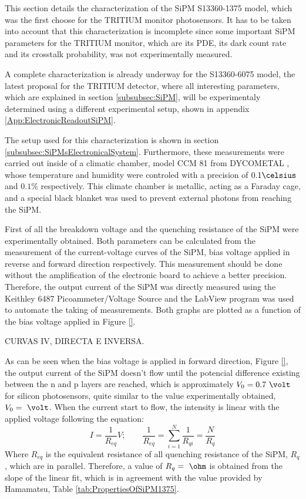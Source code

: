 This section details the characterization of the SiPM S13360-1375 model, which was the first choose for the TRITIUM monitor photosensors. It has to be taken into account that this characterization is incomplete since some important SiPM parameters for the TRITIUM monitor, which are its PDE, its dark count rate and its crosstalk probability, was not experimentally measured. 

A complete characterization is already underway for the S13360-6075 model, the latest proposal for the TRITIUM detector, where all interesting parameters, which are explained in section \ref{subsubsec:SiPM}, will be experimentaly determined using a different experimental setup, shown in appendix \ref{App:ElectronicReadoutSiPM}.

The setup used for this characterization is shown in section \ref{subsubsec:SiPMsElectronicalSystem}. Furthermore, these measurements were carried out inside of a climatic chamber, model CCM 81 from DYCOMETAL \cite{ClimaticChamberIFIMED}, whose temperature and humidity were controled with a precision of $0.1\celsius$ and $0.1\%$ respectively. This climate chamber is metallic, acting as a Faraday cage, and a special black blanket \cite{BlackBlancket} was used to prevent external photons from reaching the SiPM.

First of all the breakdown voltage and the quenching resistance of the SiPM were experimentally obtained. Both parameters can be calculated from the measurement of the current-voltage curves of the SiPM, bias voltage applied in reverse and forward direction respectively. This measurement should be done without the amplification of the electronic board to achieve a better precision. Therefore, the output current of the SiPM was directly measured using the Keithley 6487 Picoammeter/Voltage Source \cite{DataSheetKeithley6487} and the LabView program was used to automate the taking of measurements. Both graphs are plotted as a function of the bias voltage applied in Figure \ref{}.

CURVAS IV, DIRECTA E INVERSA.

As can be seen when the bias voltage is applied in forward direction, Figure \ref{}, the output current of the SiPM doesn't flow until the potencial difference existing between the n and p layers are reached, which is approximately $V_0=0.7~\volt$ for silicon photosensors, quite similar to the value experimentally obtained, $V_0= ~\volt$. When the current start to flow, the intensity is linear with the applied voltage following the equation:
\begin{equation}
I=\frac{1}{R_{eq}}V;  \qquad \frac{1}{R_{eq}} = \sum_{i=1}^{N}\frac{1}{R_{qi}}= \frac{N}{R_{q}}
\label{QuenchingResistance}
\end{equation}
Where $R_{eq}$ is the equivalent resistance of all quenching resistance of the SiPM, $R_{q}$, which are in parallel. Therefore, a value of $R_{q}= ~\ohm$ is obtained from the slope of the linear fit, which is in agreement with the value provided by Hamamatsu, Table \ref{tab:PropertiesOfSiPM1375}.


